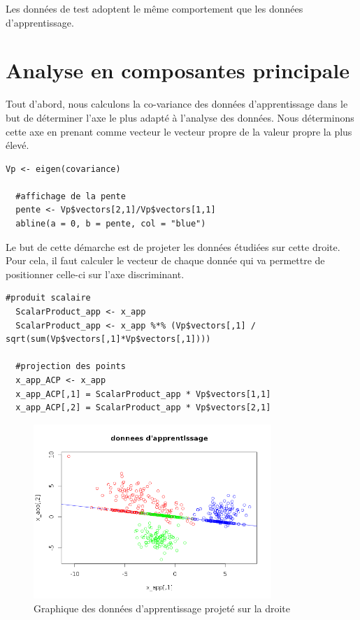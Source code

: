 \documentclass[a4paper,11pt]{article}
\begin{document}
  Les données de test adoptent le même comportement que les données d'apprentissage.
  
  \section{Analyse en composantes principale}
  
  Tout d'abord, nous calculons la co-variance des données d'apprentissage dans le but de déterminer
  l'axe le plus adapté à l'analyse des données. Nous déterminons cette axe en prenant comme vecteur
  le vecteur propre de la valeur propre la plus élevé.\\
  
  \begin{lstlisting}[caption=Calcule de l'axe discriminant]
  Vp <- eigen(covariance)

  #affichage de la pente
  pente <- Vp$vectors[2,1]/Vp$vectors[1,1]
  abline(a = 0, b = pente, col = "blue")
  \end{lstlisting}

  Le but de cette démarche est de projeter les données étudiées sur cette droite. Pour cela, il
  faut calculer le vecteur de chaque donnée qui va permettre de positionner celle-ci sur l'axe 
  discriminant.\\
  
  \begin{lstlisting}[caption=Projection des données d'apprentissage sur l'axe discriminant]
  #produit scalaire
  ScalarProduct_app <- x_app
  ScalarProduct_app <- x_app %*% (Vp$vectors[,1] / sqrt(sum(Vp$vectors[,1]*Vp$vectors[,1])))

  #projection des points
  x_app_ACP <- x_app
  x_app_ACP[,1] = ScalarProduct_app * Vp$vectors[1,1]
  x_app_ACP[,2] = ScalarProduct_app * Vp$vectors[2,1]
  \end{lstlisting}
  
  \begin{figure}[H]
  \center
   \includegraphics[width=9cm]{apprentissage_acp.png}
   \caption{Graphique des données d'apprentissage projeté sur la droite}
  \end{figure}
  
\end{document}

